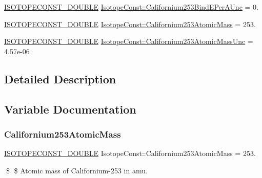 \begin{DoxyCompactItemize}
\item 
\mbox{\hyperlink{group___isotope_const-_macros_ga8f45a7272ce02c0b4c65c44636ed719a}{I\+S\+O\+T\+O\+P\+E\+C\+O\+N\+S\+T\+\_\+\+D\+O\+U\+B\+LE}} \mbox{\hyperlink{group___isotope_const-_californium-_cf253_ga69de522dd83c2a9a69000bc5d4535c7c}{Isotope\+Const\+::\+Californium253\+Bind\+E\+Per\+A\+Unc}} = 0.
\item 
\mbox{\hyperlink{group___isotope_const-_macros_ga8f45a7272ce02c0b4c65c44636ed719a}{I\+S\+O\+T\+O\+P\+E\+C\+O\+N\+S\+T\+\_\+\+D\+O\+U\+B\+LE}} \mbox{\hyperlink{group___isotope_const-_californium-_cf253_ga6aa94d125622389619661abcb33cfcb9}{Isotope\+Const\+::\+Californium253\+Atomic\+Mass}} = 253.
\item 
\mbox{\hyperlink{group___isotope_const-_macros_ga8f45a7272ce02c0b4c65c44636ed719a}{I\+S\+O\+T\+O\+P\+E\+C\+O\+N\+S\+T\+\_\+\+D\+O\+U\+B\+LE}} \mbox{\hyperlink{group___isotope_const-_californium-_cf253_ga296d13ad80773129793509af3f9198be}{Isotope\+Const\+::\+Californium253\+Atomic\+Mass\+Unc}} = 4.\+57e-\/06
\end{DoxyCompactItemize}


\subsection{Detailed Description}


\subsection{Variable Documentation}
\mbox{\label{group___isotope_const-_californium-_cf253_ga6aa94d125622389619661abcb33cfcb9}} 
\subsubsection{\texorpdfstring{Californium253\+Atomic\+Mass}{Californium253AtomicMass}}
{\footnotesize\ttfamily \mbox{\hyperlink{group___isotope_const-_macros_ga8f45a7272ce02c0b4c65c44636ed719a}{I\+S\+O\+T\+O\+P\+E\+C\+O\+N\+S\+T\+\_\+\+D\+O\+U\+B\+LE}} Isotope\+Const\+::\+Californium253\+Atomic\+Mass = 253.}

\$ \$ Atomic mass of Californium-\/253 in amu. \mbox{\label{group___isotope_const-_californium-_cf253_ga296d13ad80773129793509af3f9198be}} 
